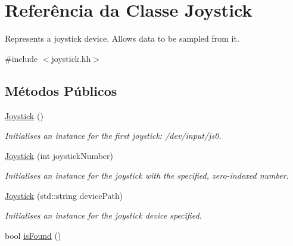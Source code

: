 \hypertarget{classJoystick}{}\section{Referência da Classe Joystick}
\label{classJoystick}


Represents a joystick device. Allows data to be sampled from it.  




{\ttfamily \#include $<$joystick.\+hh$>$}

\subsection*{Métodos Públicos}
\begin{DoxyCompactItemize}
\item 
\hyperlink{classJoystick_a158b1f77b78717efbf1b8fac43b1fcef}{Joystick} ()\hypertarget{classJoystick_a158b1f77b78717efbf1b8fac43b1fcef}{}\label{classJoystick_a158b1f77b78717efbf1b8fac43b1fcef}

\begin{DoxyCompactList}\small\item\em Initialises an instance for the first joystick\+: /dev/input/js0. \end{DoxyCompactList}\item 
\hyperlink{classJoystick_a0bd88249a8e103fe326d5345019a3de2}{Joystick} (int joystick\+Number)\hypertarget{classJoystick_a0bd88249a8e103fe326d5345019a3de2}{}\label{classJoystick_a0bd88249a8e103fe326d5345019a3de2}

\begin{DoxyCompactList}\small\item\em Initialises an instance for the joystick with the specified, zero-\/indexed number. \end{DoxyCompactList}\item 
\hyperlink{classJoystick_ac0cd7f0cb955fd62850589e1f0660285}{Joystick} (std\+::string device\+Path)\hypertarget{classJoystick_ac0cd7f0cb955fd62850589e1f0660285}{}\label{classJoystick_ac0cd7f0cb955fd62850589e1f0660285}

\begin{DoxyCompactList}\small\item\em Initialises an instance for the joystick device specified. \end{DoxyCompactList}\item 
bool \hyperlink{classJoystick_a466b80d028a829cb4aa24ae60602c646}{is\+Found} ()\hypertarget{classJoystick_a466b80d028a829cb4aa24ae60602c646}{}\label{classJoystick_a466b80d028a829cb4aa24ae60602c646}


\end{DoxyCompactItemize}
